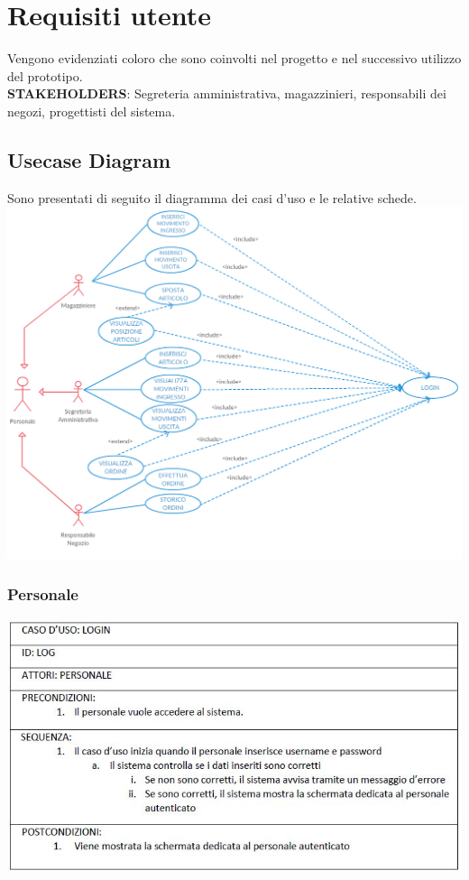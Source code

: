 \documentclass[a4paper]{article}
\begin{document}
	\section{Requisiti utente}
	Vengono evidenziati coloro che sono coinvolti nel progetto e nel successivo utilizzo del prototipo. \\
	\textbf{STAKEHOLDERS}: Segreteria amministrativa, magazzinieri, responsabili dei negozi, progettisti del sistema.

	\subsection{Usecase Diagram}
	Sono presentati di seguito il diagramma dei casi d'uso e le relative schede.
	\\ [2cm]
	\includegraphics[width=1\textwidth, height=0.5\textheight]{Usecase}
	
	\newpage
	
	\subsubsection{Personale}
	\begin{center}
		\includegraphics [scale=0.5] {login}
	\end{center}
	
\end{document}
